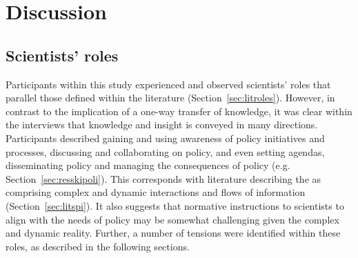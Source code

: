 \chapter{Discussion}\label{ch:discussion}


\section{Scientists' roles}\label{sec:disroles}

Participants within this study experienced and observed scientists' roles that parallel those defined within the literature (Section~\ref{sec:litroles}). However, in contrast to the implication of a one-way transfer of knowledge, it was clear within the interviews that knowledge and insight is conveyed in many directions. Participants described gaining and using awareness of policy initiatives and processes, discussing and collaborating on policy, and even setting agendas, disseminating policy and managing the consequences of policy (e.g. Section~\ref{sec:resskipoli}). This corresponds with literature describing the \SPI{} as comprising complex and dynamic interactions and flows of information (Section~\ref{sec:litspi}). It also suggests that normative instructions to scientists to align with the needs of policy may be somewhat challenging given the complex and dynamic reality. Further, a number of tensions were identified within these roles, as described in the following sections. 

